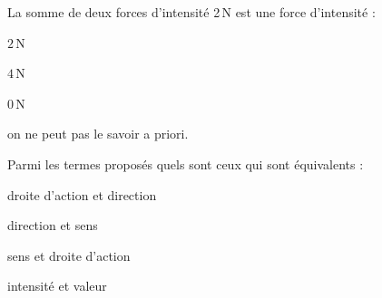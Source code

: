 \begin{QCM}
  
  \begin{GroupeQCM}
    
    \begin{exercice}
      La somme de deux forces d'intensité 2\,N est une force d'intensité :
      \begin{ChoixQCM}{4}
      \item $2$\,N
      \item $4$\,N
      \item $0$\,N
      \item on ne peut pas le savoir a priori.
      \end{ChoixQCM}
        \begin{corrige}
        \end{corrige}
    \end{exercice}
    
    
    \begin{exercice}
      Parmi les termes proposés quels sont ceux qui sont équivalents :
      \begin{ChoixQCM}{4}
      \item droite d'action et direction
      \item direction et sens
      \item sens et droite d'action
      \item intensité et valeur
      \end{ChoixQCM}
\begin{corrige}
   \end{corrige}
    \end{exercice}
    
\end{GroupeQCM}
\end{QCM}
